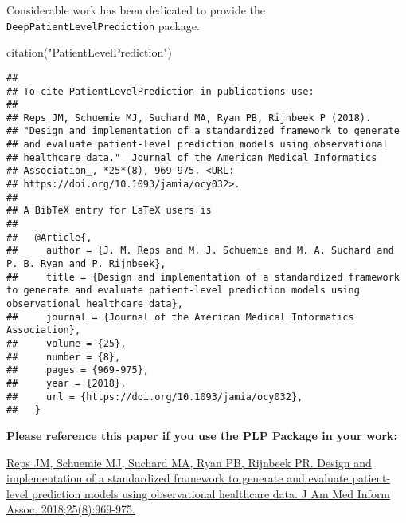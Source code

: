 \documentclass[
]{article}
\newenvironment{Shaded}{\begin{snugshade}}{\end{snugshade}}
\newcommand{\FunctionTok}[1]{\textcolor[rgb]{0.00,0.00,0.00}{#1}}
\newcommand{\NormalTok}[1]{#1}
\newcommand{\StringTok}[1]{\textcolor[rgb]{0.31,0.60,0.02}{#1}}
\begin{document}
Considerable work has been dedicated to provide the
\texttt{DeepPatientLevelPrediction} package.

\begin{Shaded}
\begin{Highlighting}[]
\FunctionTok{citation}\NormalTok{(}\StringTok{"PatientLevelPrediction"}\NormalTok{)}
\end{Highlighting}
\end{Shaded}

\begin{verbatim}
## 
## To cite PatientLevelPrediction in publications use:
## 
## Reps JM, Schuemie MJ, Suchard MA, Ryan PB, Rijnbeek P (2018).
## "Design and implementation of a standardized framework to generate
## and evaluate patient-level prediction models using observational
## healthcare data." _Journal of the American Medical Informatics
## Association_, *25*(8), 969-975. <URL:
## https://doi.org/10.1093/jamia/ocy032>.
## 
## A BibTeX entry for LaTeX users is
## 
##   @Article{,
##     author = {J. M. Reps and M. J. Schuemie and M. A. Suchard and P. B. Ryan and P. Rijnbeek},
##     title = {Design and implementation of a standardized framework to generate and evaluate patient-level prediction models using observational healthcare data},
##     journal = {Journal of the American Medical Informatics Association},
##     volume = {25},
##     number = {8},
##     pages = {969-975},
##     year = {2018},
##     url = {https://doi.org/10.1093/jamia/ocy032},
##   }
\end{verbatim}

\textbf{Please reference this paper if you use the PLP Package in your
work:}

\href{http://dx.doi.org/10.1093/jamia/ocy032}{Reps JM, Schuemie MJ,
Suchard MA, Ryan PB, Rijnbeek PR. Design and implementation of a
standardized framework to generate and evaluate patient-level prediction
models using observational healthcare data. J Am Med Inform Assoc.
2018;25(8):969-975.}
\end{document}
